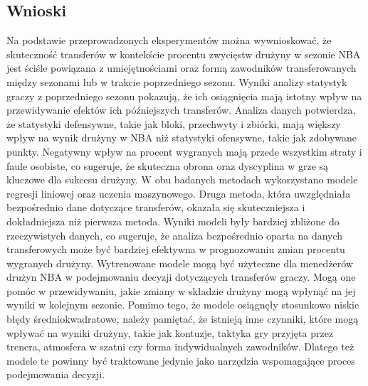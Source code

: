 \documentclass{article}
\begin{document}
\subsection{Wnioski}

Na podstawie przeprowadzonych eksperymentów można wywnioskować, że skuteczność transferów w kontekście procentu zwycięstw drużyny w sezonie NBA jest ściśle powiązana z umiejętnościami oraz formą zawodników transferowanych między sezonami lub w trakcie poprzedniego sezonu. Wyniki analizy statystyk graczy z poprzedniego sezonu pokazują, że ich osiągnięcia mają istotny wpływ na przewidywanie efektów ich późniejszych transferów.
\newline
\newline
Analiza danych potwierdza, że statystyki defensywne, takie jak bloki, przechwyty i zbiórki, mają większy wpływ na wynik drużyny w NBA niż statystyki ofensywne, takie jak zdobywane punkty. Negatywny wpływ na procent wygranych mają przede wszystkim straty i faule osobiste, co sugeruje, że skuteczna obrona oraz dyscyplina w grze są kluczowe dla sukcesu drużyny.
\newline
\newline
W obu badanych metodach wykorzystano modele regresji liniowej oraz uczenia maszynowego. Druga metoda, która uwzględniała bezpośrednio dane dotyczące transferów, okazała się skuteczniejsza i dokładniejsza niż pierwsza metoda. Wyniki modeli były bardziej zbliżone do rzeczywistych danych, co sugeruje, że analiza bezpośrednio oparta na danych transferowych może być bardziej efektywna w prognozowaniu zmian procentu wygranych drużyny.
\newline
\newline
Wytrenowane modele mogą być użyteczne dla menedżerów drużyn NBA w podejmowaniu decyzji dotyczących transferów graczy. Mogą one pomóc w przewidywaniu, jakie zmiany w składzie drużyny mogą wpłynąć na jej wyniki w kolejnym sezonie.
Pomimo tego, że modele osiągnęły stosunkowo niskie błędy średniokwadratowe, należy pamiętać, że istnieją inne czynniki, które mogą wpływać na wyniki drużyny, takie jak kontuzje, taktyka gry przyjęta przez trenera, atmosfera w szatni czy forma indywidualnych zawodników. Dlatego też modele te powinny być traktowane jedynie jako narzędzia wspomagające proces podejmowania decyzji.
\end{document}
